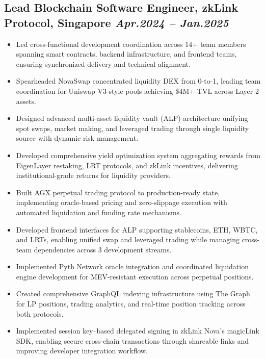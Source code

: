\documentclass[11pt,a4paper]{article}
\newcommand{\resumeItem}[1]{\item\small{#1}}
\begin{document}
\subsection{Lead Blockchain Software Engineer, zkLink Protocol, Singapore \hfill \textit{Apr.2024 -- Jan.2025}}
\begin{itemize}[leftmargin=*, itemsep=1pt, parsep=0pt]
    \resumeItem{Led cross-functional development coordination across 14+ team members spanning smart contracts, backend infrastructure, and frontend teams, ensuring synchronized delivery and technical alignment.}
    \resumeItem{Spearheaded NovaSwap concentrated liquidity DEX from 0-to-1, leading team coordination for Uniswap V3-style pools achieving \$4M+ TVL across Layer 2 assets.}
    \resumeItem{Designed advanced multi-asset liquidity vault (ALP) architecture unifying spot swaps, market making, and leveraged trading through single liquidity source with dynamic risk management.}
    \resumeItem{Developed comprehensive yield optimization system aggregating rewards from EigenLayer restaking, LRT protocols, and zkLink incentives, delivering institutional-grade returns for liquidity providers.}
    \resumeItem{Built AGX perpetual trading protocol to production-ready state, implementing oracle-based pricing and zero-slippage execution with automated liquidation and funding rate mechanisms.}
    \resumeItem{Developed frontend interfaces for ALP supporting stablecoins, ETH, WBTC, and LRTs, enabling unified swap and leveraged trading while managing cross-team dependencies across 3 development streams.}
    \resumeItem{Implemented Pyth Network oracle integration and coordinated liquidation engine development for MEV-resistant execution across perpetual positions.}
    \resumeItem{Created comprehensive GraphQL indexing infrastructure using The Graph for LP positions, trading analytics, and real-time position tracking across both protocols.}
    \resumeItem{Implemented session key–based delegated signing in zkLink Nova’s magicLink SDK, enabling secure cross-chain transactions through shareable links and improving developer integration workflow.}
\end{itemize}

\vspace{30pt}
\end{document}
